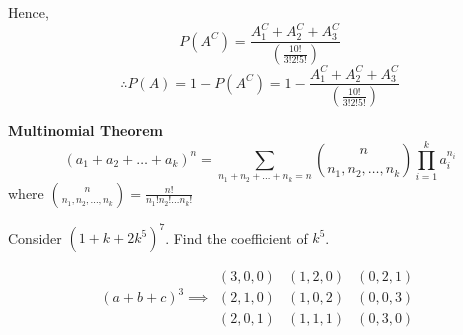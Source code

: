 \documentclass{article}
\begin{document}
\begin{sol}
\begin{figure}[h]
\begin{subfigure}{0.3\textwidth}
\begin{center}
			\end{center}
		\end{subfigure}
	\end{figure}

\noindent
	Hence, $$P(A^C) = \frac{A_1^C + A_2^C + A_3^C}{\left( \frac{10!}{3! 2! 5!} \right)} $$ $$ \therefore P(A) = 1 - P(A^C) = 1 - \frac{A_1^C + A_2^C + A_3^C}{\left( \frac{10!}{3! 2! 5!} \right)}$$
	\end{sol}

	\begin{thm} \textbf{Multinomial Theorem}
		$$ (a_1 + a_2 + \dots + a_k)^n = \sum_{n_1 + n_2 + \dots + n_k = n} \binom{n}{n_1, n_2, \dots, n_k} \prod_{i=1}^k a_i^{n_i}$$
		where $ \binom{n}{n_1, n_2, \dots, n_k} = \frac{n!}{n_1 ! n_2 ! \dots n_k !}$
	\end{thm}
	\begin{exe}
		Consider $(1+k + 2k^5)^7$. Find the coefficient of $k^5$.
	\end{exe}
	\begin{exmp}
		$$ (a+b+c)^3 \implies \begin{array}{ccc}
		\boxed{(3,0,0)}& (1,2,0)&\boxed{ (0,2,1)} \\
		(2,1,0) & (1,0,2) &(0,0,3) \\
		(2,0,1) & (1,1,1) & (0,3,0)
		\end{array}$$
	\end{exmp}
\pagebreak
\end{document}
